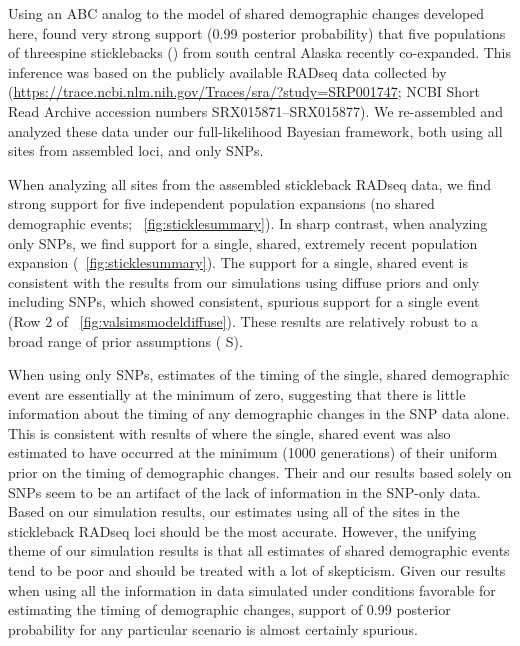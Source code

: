 Using an ABC analog to the model of shared demographic changes developed here,
\citet{Xue2015} found very strong support (0.99 posterior probability) that
five populations of threespine sticklebacks ()
from south central Alaska recently
co-expanded.
This inference was based on the publicly available RADseq data collected by
\citet{Hohenlohe2010}
(\url{https://trace.ncbi.nlm.nih.gov/Traces/sra/?study=SRP001747};
NCBI Short Read Archive accession numbers SRX015871--SRX015877).
We re-assembled and analyzed these data under our full-likelihood
Bayesian framework, both using all sites from assembled loci,
and only SNPs.

When analyzing all sites from the assembled stickleback
RADseq data, we find strong support for five independent
population expansions (no shared demographic events;
\fig{}~\ref{fig:sticklesummary}).
In sharp contrast, when analyzing only SNPs, we find
support for a single, shared, extremely recent population expansion
(\fig{}~\ref{fig:sticklesummary}).
The support for a single, shared event is consistent with the results from our
simulations using diffuse priors and only including SNPs, which showed
consistent, spurious support for a single event
(Row 2 of \fig{}~\ref{fig:valsimsmodeldiffuse}).
These results are relatively robust to a broad range of prior
assumptions
(\figs
S).

\ifembed{

}{}

When using only SNPs, estimates of the timing of the single, shared demographic
event are essentially at the minimum of zero, suggesting that there is little
information about the timing of any demographic changes in the SNP data alone.
This is consistent with results of \citet{Xue2015} where the single, shared
event was also estimated to have occurred at the minimum (1000 generations) of
their uniform prior on the timing of demographic changes.
Their and our results based solely on SNPs seem to be an artifact of the lack
of information in the SNP-only data.
Based on our simulation results, our estimates using all of the sites
in the stickleback RADseq loci should be the most accurate.
However, the unifying theme of our simulation results is that all estimates of
shared demographic events tend to be poor and should be treated with
a lot of skepticism.
Given our results when using all the information in data simulated under
conditions favorable for estimating the timing of demographic changes, support
of 0.99 posterior probability for any particular scenario is almost certainly
spurious.
